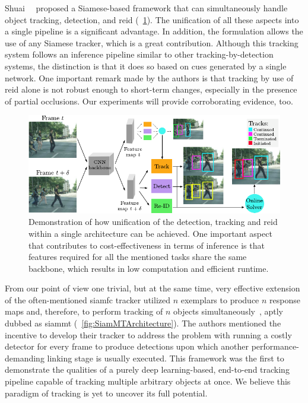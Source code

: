 Shuai~\etal{}~\cite{shuai2020multisiamrcnn} proposed a Siamese-based framework that can simultaneously handle object tracking, detection, and \gls{reid} (\figtext{}~\ref{fig:MultiSiamRCNN}). The unification of all these aspects into a single pipeline is a significant advantage. In addition, the formulation allows the use of any Siamese tracker, which is a great contribution. Although this tracking system follows an inference pipeline similar to other tracking-by-detection systems, the distinction is that it does so based on cues generated by a single network. One important remark made by the authors is that tracking by use of \gls{reid} alone is not robust enough to short-term changes, especially in the presence of partial occlusions. Our experiments will provide corroborating evidence, too.

\begin{figure}[!t]
    \centerline{\includegraphics[width=\linewidth]{figures/theoretical_foundations/motsiam_trackrcnn_architecture.pdf}}
    \caption[Siamese \gls{mot} with track R-CNN]{Demonstration of how unification of the detection, tracking and \gls{reid} within a single architecture can be achieved. One important aspect that contributes to cost-effectiveness in terms of inference is that features required for all the mentioned tasks share the same backbone, which results in low
        computation and efficient runtime. }
    \label{fig:MultiSiamRCNN}
\end{figure}

From our point of view one trivial, but at the same time, very effective extension of the often-mentioned \gls{siamfc} tracker utilized $n$ exemplars to produce $n$ response maps and, therefore, to perform tracking of $n$ objects simultaneously~\cite{vaquero2021siammt}, aptly dubbed as \gls{siammt} (\figtext{}~\ref{fig:SiamMTArchitecture}). The authors mentioned the incentive to develop their tracker to address the problem with running a costly detector for every frame to produce detections upon which another performance-demanding linking stage is usually executed. This framework was the first to demonstrate the qualities of a purely deep learning-based, end-to-end tracking pipeline capable of tracking multiple arbitrary objects at once. We believe this paradigm of tracking is yet to uncover its full potential.

